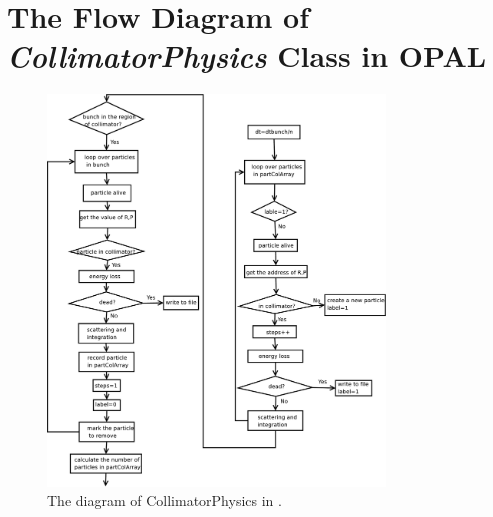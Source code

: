\section{The Flow Diagram of {\em CollimatorPhysics} Class in OPAL}
\begin{figure}[h!]
\begin{center}
\includegraphics[width=0.8\textwidth]{figures/partmatter/diagram}
\end{center}
\caption{The diagram of CollimatorPhysics in \opal. }
\label{fig:diagram}
\end{figure}
